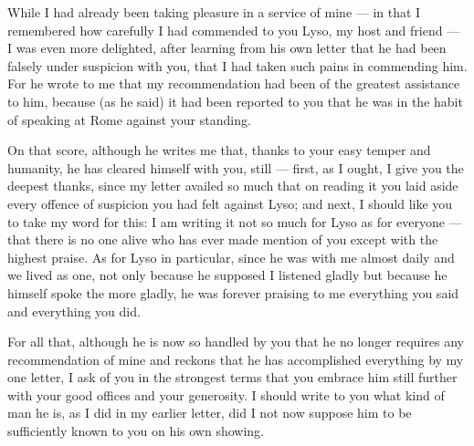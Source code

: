 

 While I had already been taking pleasure in a service of mine --- in that I remembered how carefully I had commended to you Lyso, my host and friend --- I was even more delighted, after learning from his own letter that he had been falsely under suspicion with you, that I had taken such pains in commending him. For he wrote to me that my recommendation had been of the greatest assistance to him, because (as he said) it had been reported to you that he was in the habit of speaking at Rome against your standing.

 On that score, although he writes me that, thanks to your easy temper and humanity, he has cleared himself with you, still --- first, as I ought, I give you the deepest thanks, since my letter availed so much that on reading it you laid aside every offence of suspicion you had felt against Lyso; and next, I should like you to take my word for this: I am writing it not so much for Lyso as for everyone --- that there is no one alive who has ever made mention of you except with the highest praise. As for Lyso in particular, since he was with me almost daily and we lived as one, not only because he supposed I listened gladly but because he himself spoke the more gladly, he was forever praising to me everything you said and everything you did.

 For all that, although he is now so handled by you that he no longer requires any recommendation of mine and reckons that he has accomplished everything by my one letter, I ask of you in the strongest terms that you embrace him still further with your good offices and your generosity. I should write to you what kind of man he is, as I did in my earlier letter, did I not now suppose him to be sufficiently known to you on his own showing.
